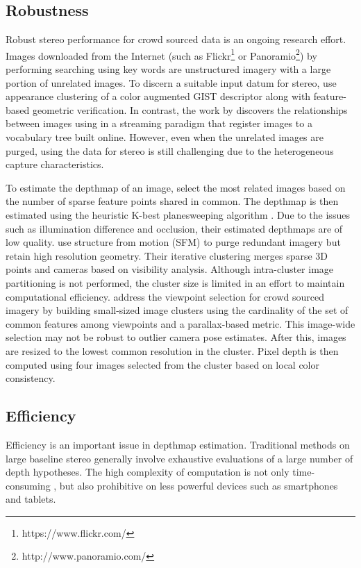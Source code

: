 \subsection{Robustness}
Robust stereo performance for crowd sourced data is an ongoing research effort.
Images downloaded from the Internet (such as Flickr\footnote{https://www.flickr.com/} or Panoramio\footnote{http://www.panoramio.com/}) by performing searching using key words are unstructured imagery with a large portion of unrelated images. To discern a suitable input datum for stereo, \citet{Frahm2010} use appearance clustering of a color augmented GIST descriptor \cite{oliva2001modeling} along with feature-based geometric verification. In contrast, the work by \citet{Heinly} discovers the relationships between images using in a streaming paradigm that register images to a vocabulary tree built online. However, even when the unrelated images are purged, using the data for stereo is still challenging due to the heterogeneous capture characteristics.

To estimate the depthmap of an image, \citet{Frahm2010} select the most related images based on the number of sparse feature points shared in common. The depthmap is then estimated using the heuristic K-best planesweeping algorithm  \cite{handle_occlusion2001}. Due to the issues such as illumination difference and occlusion, their estimated depthmaps are of low quality. 
\citet{InternetScaleMVS_CVPR2010} use structure from motion (SFM) to purge redundant imagery but retain high resolution geometry. Their iterative clustering merges sparse 3D points and cameras based on visibility analysis. Although intra-cluster image partitioning is not performed, the cluster size is limited in an effort to maintain computational efficiency. \citet{Goesele07} address the viewpoint selection for crowd sourced imagery by building small-sized image clusters using the cardinality of the set of common features among viewpoints and a parallax-based metric. This image-wide selection may not be robust to outlier camera pose estimates. After this, images are resized to the lowest common resolution in the cluster. Pixel depth is then computed using four images selected from the cluster based on local color consistency.

\subsection{Efficiency}
Efficiency is an important issue in depthmap estimation. Traditional methods on large baseline stereo generally involve exhaustive evaluations of a large number of depth hypotheses. The high complexity of computation is not only time-consuming \cite{yang2003multi,CombinedDepthOutlier,Gallup07,LeastCommitment_3DIMPVT2012}, but also prohibitive on  less powerful devices such as smartphones and tablets. 

